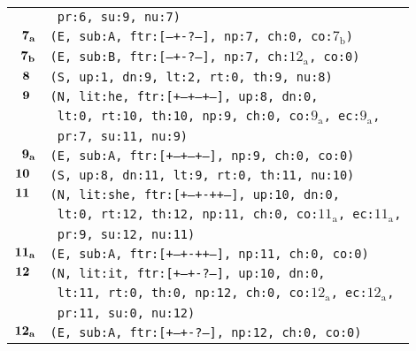 \documentclass{article}
\begin{document}
\begin{minipage}{\textwidth}
{\begin{tabular}{|r|l|}
    & \texttt{\texttt{~pr:6,~su:9,~nu:7)}} \\
    ${\textbf{\textrm{7}}_{\textbf{\textrm{a}}}}$ & \texttt{\texttt{(E,~sub:A,~ftr:[---+-?---],~np:7,~ch:0,~co:${\textrm{7}_{\textrm{b}}}$)}} \\
    ${\textbf{\textrm{7}}_{\textbf{\textrm{b}}}}$ & \texttt{\texttt{(E,~sub:B,~ftr:[---+-?---],~np:7,~ch:${\textrm{12}_{\textrm{a}}}$,~co:0)}} \\
    ${\textbf{\textrm{8}}_{\phantom{z}}}$ & \texttt{\texttt{(S,~up:1,~dn:9,~lt:2,~rt:0,~th:9,~nu:8)}} \\
    ${\textbf{\textrm{9}}_{\phantom{z}}}$ & \texttt{\texttt{(N,~lit:he,~ftr:[+--+--+--],~up:8,~dn:0,}} \\
    & \texttt{\texttt{~lt:0,~rt:10,~th:10,~np:9,~ch:0,~co:${\textrm{9}_{\textrm{a}}}$,~ec:${\textrm{9}_{\textrm{a}}}$,}} \\
    & \texttt{\texttt{~pr:7,~su:11,~nu:9)}} \\
    ${\textbf{\textrm{9}}_{\textbf{\textrm{a}}}}$ & \texttt{\texttt{(E,~sub:A,~ftr:[+--+--+--],~np:9,~ch:0,~co:0)}} \\
    ${\textbf{\textrm{10}}_{\phantom{z}}}$ & \texttt{\texttt{(S,~up:8,~dn:11,~lt:9,~rt:0,~th:11,~nu:10)}} \\
    ${\textbf{\textrm{11}}_{\phantom{z}}}$ & \texttt{\texttt{(N,~lit:she,~ftr:[+--+-++--],~up:10,~dn:0,}} \\
    & \texttt{\texttt{~lt:0,~rt:12,~th:12,~np:11,~ch:0,~co:${\textrm{11}_{\textrm{a}}}$,~ec:${\textrm{11}_{\textrm{a}}}$,}} \\
    & \texttt{\texttt{~pr:9,~su:12,~nu:11)}} \\
    ${\textbf{\textrm{11}}_{\textbf{\textrm{a}}}}$ & \texttt{\texttt{(E,~sub:A,~ftr:[+--+-++--],~np:11,~ch:0,~co:0)}} \\
    ${\textbf{\textrm{12}}_{\phantom{z}}}$ & \texttt{\texttt{(N,~lit:it,~ftr:[+--+-?---],~up:10,~dn:0,}} \\
    & \texttt{\texttt{~lt:11,~rt:0,~th:0,~np:12,~ch:0,~co:${\textrm{12}_{\textrm{a}}}$,~ec:${\textrm{12}_{\textrm{a}}}$,}} \\
    & \texttt{\texttt{~pr:11,~su:0,~nu:12)}} \\
    ${\textbf{\textrm{12}}_{\textbf{\textrm{a}}}}$ & \texttt{\texttt{(E,~sub:A,~ftr:[+--+-?---],~np:12,~ch:0,~co:0)}} \\
    \hline
  \end{tabular}
  }
\end{minipage}
\bigbreak
\end{document}
